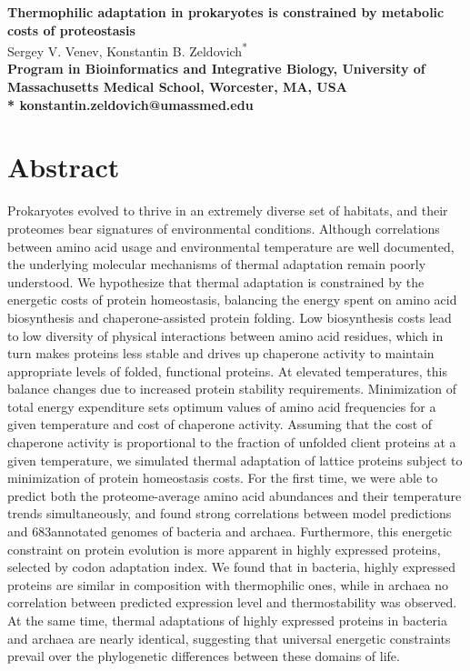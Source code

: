 \documentclass[10pt,letterpaper]{article}
\date{}
\newcommand{\ARCHBACTERTOTAL}{683}
\begin{document}
\vspace*{0.35in}


\begin{flushleft}
{\Large
\textbf{Thermophilic adaptation in prokaryotes is constrained by metabolic costs of proteostasis}
}
\newline
\\
Sergey V. Venev, 
Konstantin B. Zeldovich\textsuperscript{*}
\\
\bigskip
\bf{} Program in Bioinformatics and Integrative Biology, University of Massachusetts Medical School, Worcester, MA, USA
\\
\bigskip
* konstantin.zeldovich@umassmed.edu
\end{flushleft}

\section*{Abstract}
Prokaryotes evolved to thrive in an extremely diverse set of habitats, and their proteomes bear signatures of environmental conditions. Although correlations between amino acid usage and environmental temperature are well documented, the underlying molecular mechanisms of thermal adaptation remain poorly understood. We hypothesize that thermal adaptation is constrained by the energetic costs of protein homeostasis, balancing the energy spent on amino acid biosynthesis and chaperone-assisted protein folding. Low biosynthesis costs lead to low diversity of physical interactions between amino acid residues, which in turn makes proteins less stable and drives up chaperone activity to maintain appropriate levels of folded, functional proteins. At elevated temperatures, this balance changes due to increased protein stability requirements. Minimization of total energy expenditure sets optimum values of amino acid frequencies for a given temperature and cost of chaperone activity. Assuming that the cost of chaperone activity is proportional to the fraction of unfolded client proteins at a given temperature, we simulated thermal adaptation of lattice proteins subject to minimization of protein homeostasis costs. For the first time, we were able to predict both the proteome-average amino acid abundances and their temperature trends simultaneously, and found strong correlations between model predictions and \ARCHBACTERTOTAL annotated genomes of bacteria and archaea. Furthermore, this energetic constraint on protein evolution is more apparent in highly expressed proteins, selected by codon adaptation index. We found that in bacteria, highly expressed proteins are similar in composition with thermophilic ones, while in archaea no correlation between predicted expression level and thermostability was observed.
At the same time, thermal adaptations of highly expressed proteins in bacteria and archaea are nearly identical, suggesting that universal energetic constraints prevail over the phylogenetic differences between these domains of life.
\end{document}
